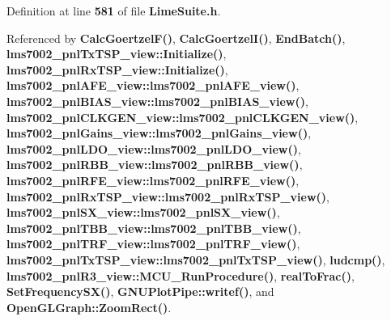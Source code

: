 Definition at line {\bf 581} of file {\bf Lime\+Suite.\+h}.



Referenced by {\bf Calc\+Goertzel\+F()}, {\bf Calc\+Goertzel\+I()}, {\bf End\+Batch()}, {\bf lms7002\+\_\+pnl\+Tx\+T\+S\+P\+\_\+view\+::\+Initialize()}, {\bf lms7002\+\_\+pnl\+Rx\+T\+S\+P\+\_\+view\+::\+Initialize()}, {\bf lms7002\+\_\+pnl\+A\+F\+E\+\_\+view\+::lms7002\+\_\+pnl\+A\+F\+E\+\_\+view()}, {\bf lms7002\+\_\+pnl\+B\+I\+A\+S\+\_\+view\+::lms7002\+\_\+pnl\+B\+I\+A\+S\+\_\+view()}, {\bf lms7002\+\_\+pnl\+C\+L\+K\+G\+E\+N\+\_\+view\+::lms7002\+\_\+pnl\+C\+L\+K\+G\+E\+N\+\_\+view()}, {\bf lms7002\+\_\+pnl\+Gains\+\_\+view\+::lms7002\+\_\+pnl\+Gains\+\_\+view()}, {\bf lms7002\+\_\+pnl\+L\+D\+O\+\_\+view\+::lms7002\+\_\+pnl\+L\+D\+O\+\_\+view()}, {\bf lms7002\+\_\+pnl\+R\+B\+B\+\_\+view\+::lms7002\+\_\+pnl\+R\+B\+B\+\_\+view()}, {\bf lms7002\+\_\+pnl\+R\+F\+E\+\_\+view\+::lms7002\+\_\+pnl\+R\+F\+E\+\_\+view()}, {\bf lms7002\+\_\+pnl\+Rx\+T\+S\+P\+\_\+view\+::lms7002\+\_\+pnl\+Rx\+T\+S\+P\+\_\+view()}, {\bf lms7002\+\_\+pnl\+S\+X\+\_\+view\+::lms7002\+\_\+pnl\+S\+X\+\_\+view()}, {\bf lms7002\+\_\+pnl\+T\+B\+B\+\_\+view\+::lms7002\+\_\+pnl\+T\+B\+B\+\_\+view()}, {\bf lms7002\+\_\+pnl\+T\+R\+F\+\_\+view\+::lms7002\+\_\+pnl\+T\+R\+F\+\_\+view()}, {\bf lms7002\+\_\+pnl\+Tx\+T\+S\+P\+\_\+view\+::lms7002\+\_\+pnl\+Tx\+T\+S\+P\+\_\+view()}, {\bf ludcmp()}, {\bf lms7002\+\_\+pnl\+R3\+\_\+view\+::\+M\+C\+U\+\_\+\+Run\+Procedure()}, {\bf real\+To\+Frac()}, {\bf Set\+Frequency\+S\+X()}, {\bf G\+N\+U\+Plot\+Pipe\+::writef()}, and {\bf Open\+G\+L\+Graph\+::\+Zoom\+Rect()}.

